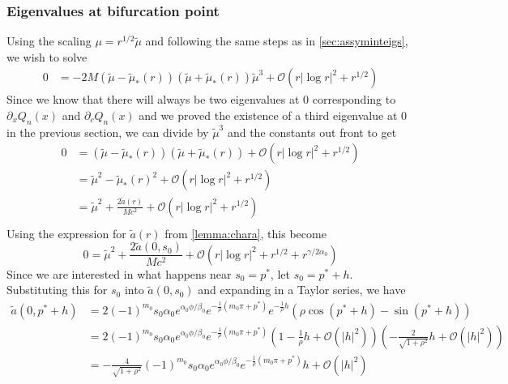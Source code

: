 \documentclass[thesis.tex]{subfiles}
\begin{document}
\subsubsection{Eigenvalues at bifurcation point}
Using the scaling $\mu = r^{1/2} \tilde{\mu}$ and following the same steps as in \cref{sec:assyminteigs}, we wish to solve
\begin{equation*}
\begin{aligned}
0 &= -2 M (\tilde{\mu} - \tilde{\mu}_*(r)) (\tilde{\mu} + \tilde{\mu}_*(r))\tilde{\mu}^3 + \mathcal{O}\left( r |\log r|^2 + r^{1/2} \right)
\end{aligned}
\end{equation*}
Since we know that there will always be two eigenvalues at 0 corresponding to $\partial_x Q_n(x)$ and $\partial_c Q_n(x)$ and we proved the existence of a third eigenvalue at 0 in the previous section, we can divide by $\tilde{\mu}^3$ and the constants out front to get 
\begin{align*}
0 &= (\tilde{\mu} - \tilde{\mu}_*(r)) (\tilde{\mu} + \tilde{\mu}_*(r)) + \mathcal{O}\left( r |\log r|^2 + r^{1/2} \right) \\
&= \tilde{\mu}^2 - \tilde{\mu}_*(r)^2 + \mathcal{O}\left( r |\log r|^2 + r^{1/2} \right) \\
&= \tilde{\mu}^2 + \frac{2\tilde{a}(r)}{M c^2} + \mathcal{O}\left( r |\log r|^2 + r^{1/2} \right) \\
\end{align*}
Using the expression for $\tilde{a}(r)$ from \cref{lemma:chara}, this become
\begin{equation}\label{Gsymm1}
0 = \tilde{\mu}^2 + \frac{2\tilde{a}(0, s_0)}{M c^2} + \mathcal{O}\left( r |\log r|^2 + r^{1/2} + r^{\gamma/2\alpha_0} \right)
\end{equation}
Since we are interested in what happens near $s_0 = p^*$, let $s_0 = p^* + h$. Substituting this for $s_0$ into $\tilde{a}(0, s_0)$ and expanding in a Taylor series, we have
\begin{align*}
\tilde{a}(0, p^* + h) &= 2 (-1)^{m_0} s_0 \alpha_0 e^{\alpha_0 \phi/\beta_0} e^{-\frac{1}{\rho}(m_0 \pi + p^*) } e^{-\frac{1}{\rho}h }\left( \rho \cos(p^* + h) - \sin(p^* + h) \right) \\
&= 2 (-1)^{m_0} s_0 \alpha_0 e^{\alpha_0 \phi/\beta_0} e^{-\frac{1}{\rho}(m_0 \pi + p^*) }\left( 1 - \frac{1}{\rho}h + \mathcal{O}(|h|^2) \right) \left( -\frac{2}{\sqrt{1 + \rho^2} }h + \mathcal{O}(|h|^2) \right) \\
&= -\frac{4}{\sqrt{1 + \rho^2} }(-1)^{m_0} s_0 \alpha_0 e^{\alpha_0 \phi/\beta_0} e^{-\frac{1}{\rho}(m_0 \pi + p^*) }h + \mathcal{O}(|h|^2)
\end{align*}
\end{document}
